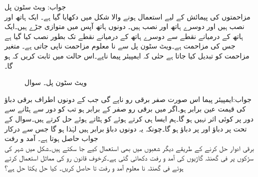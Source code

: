 جواب:
\quad ویٹ سٹون پل\\
مزاحمتوں کی پیمائش کے لیے استعمال ہونے والا  شکل میں دکھایا گیا ہے۔ ایک ہاتھ   اور  نصب ہیں اور دوسرے ہاتھ  اور  نصب ہیں۔ دونوں ہاتھ آپس میں متوازی جڑے ہیں۔ایک ہاتھ کے درمیانے نقطے سے دوسرے ہاتھ کے درمیانے نقطے تک   بطور  نصب کیا گیا ہے جس کی مزاحمت  ہے۔ویٹ سٹون پل سے نا معلوم مزاحمت  ناپی جاتی ہے۔ متغیر مزاحمت  کو تبدیل کیا جاتا ہے حتٰی کہ  ایمپیئر پیما  ناپے۔اس حالت میں ثابت کریں کہ  ہو گا۔  
\begin{figure}
\centering
{}
\caption{ویٹ سٹون پل۔ سوال }
\label{شکل_سوال_الجبرا_ویٹ_سٹون_پل}
\end{figure}
جواب:ایمپیئر پیما اس صورت صفر برقی رو ناپے گی جب  کے دونوں اطراف برقی دباؤ کی قیمت عین برابر ہو۔اگر  میں برقی رو صفر کے برابر ہو تب  کو دور سے ہٹانے سے دور پر کوئی اثر نہیں ہو گا۔ہم ایسا ہی کرتے ہوئے  کو ہٹاتے ہوئے حل کرتے ہیں۔سوال  کے تحت  پر دباؤ  اور  پر دباؤ  ہو گا۔چونکہ یہ دونوں دباؤ برابر ہیں لہٰذا  ہو گا جس سے درکار جواب حاصل ہوتا ہے۔
\quad آمد و رفت\\
برقی ادوار حل کرنے کے طریقے دیگر شعبوں میں بھی استعمال کیے جا سکتے ہیں۔شکل  میں شہر کی سڑکوں پر فی گھنٹہ گاڑیوں کی آمد و رفت دکھائی گئی ہے۔کرخوف قانون رو کی مماثل استعمال کرتے ہوئے فی گھنٹہ نا معلوم آمد و رفت  تا  حاصل کریں۔ کیا حل یکتا حل ہے؟ 
